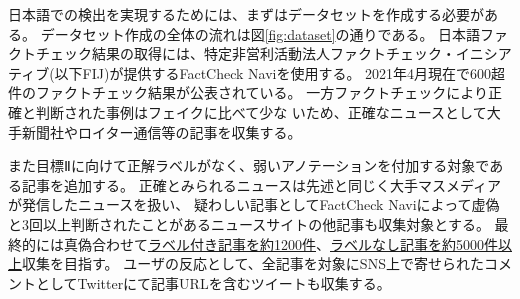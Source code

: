 
\vspace{20pt}
日本語での検出を実現するためには、まずはデータセットを作成する必要がある。
データセット作成の全体の流れは図\ref{fig:dataset}の通りである。
日本語ファクトチェック結果の取得には、特定非営利活動法人ファクトチェック・イニシアティブ(以下FIJ)が提供するFactCheck Naviを使用する。
2021年4月現在で600超件のファクトチェック結果が公表されている。%
一方ファクトチェックにより正確と判断された事例はフェイクに比べて少な%
いため、正確なニュースとして大手新聞社やロイター通信等の記事を収集する。

また目標Ⅱに向けて正解ラベルがなく、弱いアノテーションを付加する対象である記事を追加する。
正確とみられるニュースは先述と同じく大手マスメディアが発信したニュースを扱い、
疑わしい記事としてFactCheck Naviによって虚偽と3回以上判断されたことがあるニュースサイトの他記事も収集対象とする。
最終的には真偽合わせて\underline{ラベル付き記事を約1200件}、\underline{ラベルなし記事を約5000件以上}収集を目指す。
ユーザの反応として、全記事を対象にSNS上で寄せられたコメントとしてTwitterにて記事URLを含むツイートも収集する。

